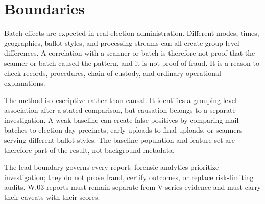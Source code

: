 \section{Boundaries}

Batch effects are expected in real election administration. Different modes,
times, geographies, ballot styles, and processing streams can all create
group-level differences. A correlation with a scanner or batch is therefore not
proof that the scanner or batch caused the pattern, and it is not proof of
fraud. It is a reason to check records, procedures, chain of custody, and
ordinary operational explanations.

The method is descriptive rather than causal. It identifies a grouping-level
association after a stated comparison, but causation belongs to a separate
investigation. A weak baseline can create false positives by comparing mail
batches to election-day precincts, early uploads to final uploads, or scanners
serving different ballot styles. The baseline population and feature set are
therefore part of the result, not background metadata.

The lead boundary governs every report: forensic analytics prioritize
investigation; they do not prove fraud, certify outcomes, or replace
risk-limiting audits. W.03 reports must remain separate from V-series evidence
and must carry their caveats with their scores.
